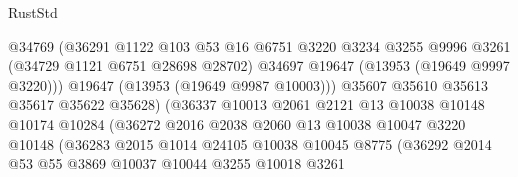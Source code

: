 \begin{lexlean}{RustStd}
\begin{coremodule}
                                    @34769
                                    (@36291
                                      @1122
                                      @103
                                      @53
                                      @16
                                      @6751
                                      @3220
                                      @3234
                                      @3255
                                      @9996
                                      @3261
                                      (@34729 @1121 @6751 @28698 @28702)
                                      @34697
                                      @19647
                                      (@13953 (@19649 @9997 @3220)))
                                    @19647
                                    (@13953 (@19649 @9987 @10003)))
                                  @35607
                                  @35610
                                  @35613
                                  @35617
                                  @35622
                                  @35628)
                                (@36337
                                  @10013
                                  @2061
                                  @2121
                                  @13
                                  @10038
                                  @10148
                                  @10174
                                  @10284
                                  (@36272
                                    @2016
                                    @2038
                                    @2060
                                    @13
                                    @10038
                                    @10047
                                    @3220
                                    @10148
                                    (@36283
                                      @2015
                                      @1014
                                      @24105
                                      @10038
                                      @10045
                                      @8775
                                      (@36292
                                        @2014
                                        @53
                                        @55
                                        @3869
                                        @10037
                                        @10044
                                        @3255
                                        @10018
                                        @3261

\end{coremodule}
\end{lexlean}
